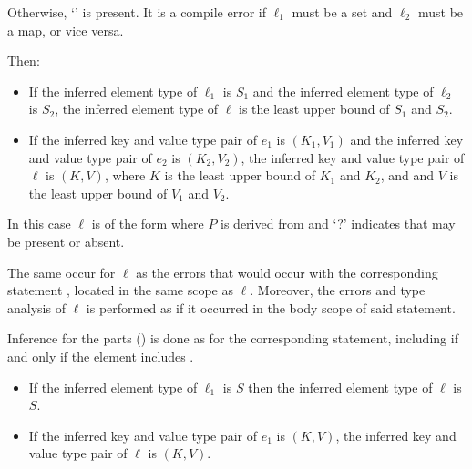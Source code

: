 \documentclass[makeidx]{article}
\begin{document}
{Otherwise, `' is present.
It is a compile error if $\ell_1$ must be a set and $\ell_2$ must be a map,
or vice versa.


Then:

\begin{itemize}
\item
  If the inferred element type of $\ell_1$ is $S_1$ and
  the inferred element type of $\ell_2$ is $S_2$,
  the inferred element type of $\ell$ is
  the least upper bound of $S_1$ and $S_2$.
\item
  If the inferred key and value type pair of $e_1$ is
  $(K_1, V_1)$
  and the inferred key and value type pair of $e_2$ is
  $(K_2, V_2)$,
  the inferred key and value type pair of $\ell$ is
  $(K, V)$,
  where $K$ is the least upper bound of $K_1$ and $K_2$, and
  and $V$ is the least upper bound of $V_1$ and $V_2$.
\end{itemize}
\vspace{-5mm}
\EndCase

\LMHash{}%
In this case $\ell$ is of the form
where $P$ is derived from  and
`\AWAIT?' indicates that \AWAIT{} may be present or absent.

The same  occur for $\ell$ as
the errors that would occur with the corresponding \FOR{} statement
,
located in the same scope as $\ell$.
Moreover, the errors and type analysis of $\ell$ is performed
as if it occurred in the body scope of said \FOR{} statement.


Inference for the parts
()
is done as for the corresponding \FOR{} statement,
including \AWAIT{} if and only if the element includes \AWAIT.

\begin{itemize}
\item
  If the inferred element type of $\ell_1$ is $S$ then
  the inferred element type of $\ell$ is $S$.
\item
  If the inferred key and value type pair of $e_1$ is $(K, V)$,
  the inferred key and value type pair of $\ell$ is $(K, V)$.
\end{itemize}

}
\end{document}
